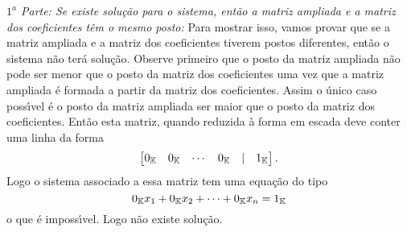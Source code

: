 \begin{prova}
\textit{$1^a$ Parte: Se existe solu\c{c}\~ao para o sistema, ent\~ao a matriz ampliada e a matriz dos coeficientes t\^em o mesmo posto:} Para mostrar isso, vamos provar que se a matriz ampliada e a matriz dos coeficientes tiverem postos diferentes, ent\~ao o sistema n\~ao ter\'a solu\c{c}\~ao. Observe primeiro que o posto da matriz ampliada n\~ao pode ser menor que o posto da matriz dos coeficientes uma vez que a matriz ampliada \'e formada a partir da matriz dos coeficientes. Assim o \'unico caso poss{\'\i}vel \'e o posto da matriz ampliada ser maior que o posto da matriz dos coeficientes. Ent\~ao esta matriz, quando reduzida \`a forma em escada deve conter uma linha da forma
\[
\begin{bmatrix}
0_{\mathbb{K}} & 0_{\mathbb{K}} & \cdots & 0_{\mathbb{K}} & \mid & 1_{\mathbb{K}}
\end{bmatrix}.
\]
Logo o sistema associado a essa matriz tem uma equa\c{c}\~ao do tipo
\[
0_{\mathbb{K}}x_1 + 0_{\mathbb{K}}x_2 + \cdots + 0_{\mathbb{K}}x_n = 1_{\mathbb{K}}
\]
o que \'e imposs{\'\i}vel. Logo n\~ao existe solu\c{c}\~ao.


\end{prova}
